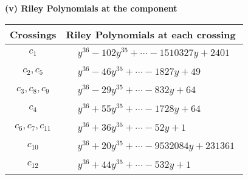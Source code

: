 \documentclass[1p]{elsarticle_modified}
\theoremstyle{definition}
\begin{document}
\newpage\renewcommand{\arraystretch}{1}
\flushleft \textbf{(v) Riley Polynomials at the component}\newline \\
\begin{tabular}{m{50pt}|m{274pt}}
Crossings & \hspace{64pt}Riley Polynomials at each crossing \\
\hline $$\begin{aligned}c_{1}\end{aligned}$$&$\begin{aligned}
&y^{36}-102 y^{35}+\cdots-1510327 y+2401
\end{aligned}$\\
\hline $$\begin{aligned}c_{2},c_{5}\end{aligned}$$&$\begin{aligned}
&y^{36}-46 y^{35}+\cdots-1827 y+49
\end{aligned}$\\
\hline $$\begin{aligned}c_{3},c_{8},c_{9}\end{aligned}$$&$\begin{aligned}
&y^{36}-29 y^{35}+\cdots-832 y+64
\end{aligned}$\\
\hline $$\begin{aligned}c_{4}\end{aligned}$$&$\begin{aligned}
&y^{36}+55 y^{35}+\cdots-1728 y+64
\end{aligned}$\\
\hline $$\begin{aligned}c_{6},c_{7},c_{11}\end{aligned}$$&$\begin{aligned}
&y^{36}+36 y^{35}+\cdots-52 y+1
\end{aligned}$\\
\hline $$\begin{aligned}c_{10}\end{aligned}$$&$\begin{aligned}
&y^{36}+20 y^{35}+\cdots-9532084 y+231361
\end{aligned}$\\
\hline $$\begin{aligned}c_{12}\end{aligned}$$&$\begin{aligned}
&y^{36}+44 y^{35}+\cdots-532 y+1
\end{aligned}$\\
\hline
\end{tabular}\\~\\
\end{document}
